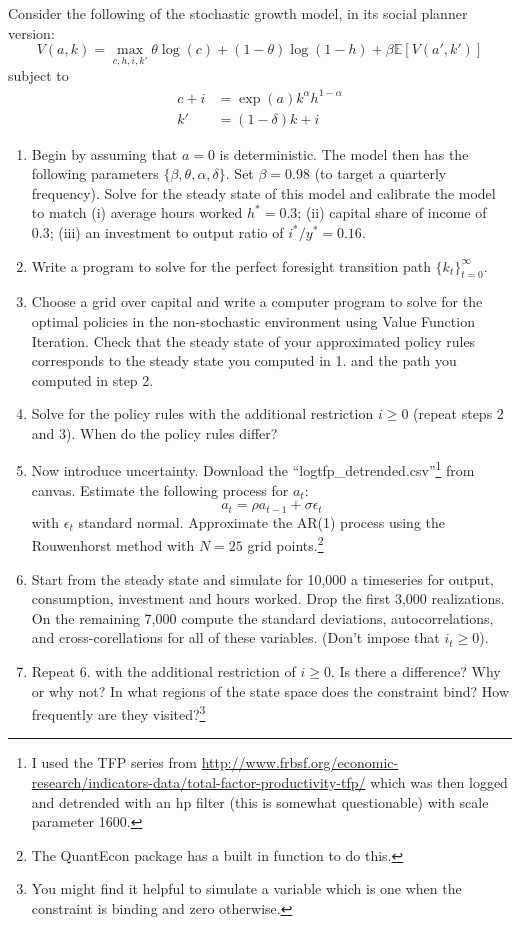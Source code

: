 \documentclass{exam}
\begin{document}
Consider the following of the stochastic growth model, in its social planner version:
\[
	V(a,k) = \max_{c,h,i,k'} \theta\log(c)+(1-\theta)\log(1-h)+\beta\mathbb E[V(a',k')]
\]subject to
\begin{align*}
	c + i &= \exp(a) k^\alpha h^{1-\alpha}\\
	k' &= (1-\delta)k + i
\end{align*}
\begin{enumerate}
 	\item Begin by assuming that $a=0$ is deterministic.  The model then has the following parameters $\{\beta,\theta,\alpha,\delta\}$.  Set $\beta = 0.98$ (to target a quarterly frequency).  Solve for the steady state of this model and calibrate the model to match (i) average hours worked $h^* = 0.3$; (ii) capital share of income of 0.3; (iii) an investment to output ratio of $i^*/y^*=0.16$.
 	\item Write a program to solve for the perfect foresight transition path $\{k_t\}_{t=0}^\infty$.
 	\item Choose a grid over capital and write a computer program to solve for the optimal policies in the non-stochastic environment using Value Function Iteration.  Check that the steady state of your approximated policy rules corresponds to  the steady state you computed in 1. and the path you computed in step 2.
 	\item  Solve for the policy rules with the additional restriction $i\geq 0$ (repeat steps 2 and 3).  When do the policy rules differ?  
 	\item  Now introduce uncertainty.  Download the ``logtfp\_detrended.csv''\footnote{I used the TFP series from \url{http://www.frbsf.org/economic-research/indicators-data/total-factor-productivity-tfp/} which was then logged and detrended with an hp filter (this is somewhat questionable) with scale parameter 1600.} from canvas.  Estimate the following process for $a_t$:
 	\[
 		a_t = \rho a_{t-1} +\sigma \epsilon_t
 	\]with $\epsilon_t$ standard normal.  Approximate the AR(1) process using the Rouwenhorst method with $N=25$ grid points.\footnote{The QuantEcon package has a built in function to do this.}
 	\item  Start from the steady state and simulate for 10,000 a timeseries for output, consumption, investment and hours worked.  Drop the first 3,000 realizations.  On the remaining 7,000 compute the standard deviations, autocorrelations, and cross-corellations for all of these variables. (Don't impose that $i_t\geq0$).
 	\item  Repeat 6. with the additional restriction of $i\geq 0$.  Is there a difference?  Why or why not?  In what regions of the state space does the constraint bind?  How frequently are they visited?\footnote{You might find it helpful to simulate a variable which is one when the constraint is binding and zero otherwise.}
 \end{enumerate} 
\end{document}
